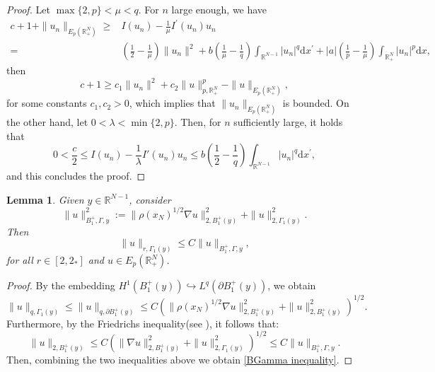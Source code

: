 \documentclass[12pt,reqno]{amsart}
\newtheorem{lemma}[theorem]{Lemma}
\begin{document}
\begin{proof} Let $\max\{2,p\}<\mu<q$. For $n$ large enough, we have 
\begin{align*}
c+1+\|u_n\|_{E_p(\mathds{R}^N_+)} \geq& I(u_n)-\frac{1}{\mu}I^\prime(u_n)u_n\\
=&\left(\frac{1}{2}-\frac{1}{\mu}\right)\|u_n\|^2+b\left(\frac{1}{\mu}-\frac{1}{q}\right)\int_{\mathds{R}^{N-1}}|u_n|^q\mathrm{d}x^\prime+|a|\left(\frac{1}{p}-\frac{1}{\mu}\right)\int_{\mathds{R}^N_+}|u_n|^p\mathrm{d}x,
\end{align*}
then 
\begin{equation*}
    c+1\geq c_1\|u_n\|^2+c_2\|u\|_{p,\mathds{R}^N_+}^p-\|u\|_{E_p(\mathds{R}^N_+)},
\end{equation*}
for some constants $c_1,c_2>0$, which implies
that $\|u_n\|_{E_p(\mathds{R}^N_+)}$ is bounded. On the other hand, let $0<\lambda<\min\{2,p\}$. Then, for $n$ sufficiently large, it holds that 
$$
0<\frac{c}{2}\leq I(u_n)-\frac{1}{\lambda} I'(u_n)u_n\leq b\left(\frac{1}{2}-\frac{1}{q}\right)\int_{\mathds{R}^{N-1}}|u_n|^q\mathrm{d}x^\prime,
$$
and this concludes the proof.
\end{proof}

\begin{lemma}\label{key lemma}  Given $y\in \mathds{R}^{N-1}$, consider
\begin{equation*}\label{BGamma norm}
    \|u\|_{B^+_1, \Gamma, y}^2:=\|\rho(x_N)^{1/2}\nabla u\|_{2, B_1^+(y)}^2+\|u\|_{2,  \Gamma_1(y)}^2.
\end{equation*}
Then
\begin{equation}\label{BGamma inequality}
    \|u\|_{r, \Gamma_1(y)}\leq C  \|u\|_{B^+_1, \Gamma, y},
\end{equation}
for all $r \in [2,2_\ast]$ and $u  \in E_p(\mathds{R}^N_+)$.
\end{lemma}

\begin{proof} By the embedding $H^1(B_1^+(y))\hookrightarrow L^q(\partial B_1^+(y))$, we obtain
\begin{equation*}
    \|u\|_{q, \Gamma_1(y)}\leq \|u\|_{q, \partial B_1^+(y)}\leq C(\|\rho(x_N)^{1/2}\nabla u\|_{2, B_1^+(y)}^2+\|u\|_{2,B_1^+(y)}^2)^{1/2}.
\end{equation*}
Furthermore, by the Friedrichs inequality(see \cite[Lemma 3.1]{CAOM}), it follows that:
\[
\|u\|_{2,B_1^+(y)}\leq C(\|\nabla u\|_{2, B_1^+(y)}^2+\|u\|_{2, \Gamma_1(y)}^2)^{1/2}\leq C\|u\|_{B_1^+,\Gamma,y}.
\]
Then, combining the two inequalities above we obtain \eqref{BGamma inequality}.
\end{proof}
\end{document}

